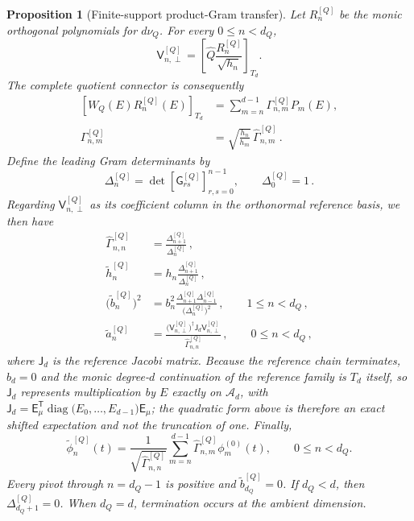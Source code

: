 \documentclass[a4paper,11pt]{article}
\def\dd{d}%
\newtheorem{proposition}{Proposition}[section]
\theoremstyle{definition}
\theoremstyle{remark}
\newcommand{\dd}{\mathrm d}
\newcommand{\cA}{\mathcal A}
\newcommand{\diag}{\operatorname{diag}}
\newcommand{\tphi}{\widetilde\phi}
\newcommand{\thh}{\widetilde h}
\newcommand{\Qhat}{\widehat Q}
\begin{document}
\begin{proposition}[Finite-support product-Gram transfer]
\label{prop:finite-product-Gram}
Let $R_n^{[Q]}$ be the monic orthogonal polynomials for $\dd\nu_Q$.
For every $0\le n<d_Q$,
\begin{equation}
   \mathsf V_{n,\perp}^{[Q]}
   =\left[
      \Qhat\frac{R_n^{[Q]}}{\sqrt{h_n}}
   \right]_{T_d}.
   \label{eq:finite-product-residual-polynomial-app}
\end{equation}
The complete quotient connector is consequently
\begin{equation}
\begin{aligned}
   \left[
      W_Q(E)R_n^{[Q]}(E)
   \right]_{T_d}
   &=\sum_{m=n}^{d-1}
   \Gamma_{n,m}^{[Q]}P_m(E),\\
   \Gamma_{n,m}^{[Q]}
   &=\sqrt{\frac{h_n}{h_m}}\,
   \widehat\Gamma_{n,m}^{[Q]}\,.
\end{aligned}
   \label{eq:finite-product-connector-app}
\end{equation}
Define the leading Gram determinants by
\begin{equation}
   \Delta_n^{[Q]}
   =\det\!\left[
      \mathsf G_{rs}^{[Q]}
   \right]_{r,s=0}^{n-1},
   \qquad \Delta_0^{[Q]}=1\,.
\end{equation}
Regarding $\mathsf V_{n,\perp}^{[Q]}$ as its coefficient column in the
orthonormal reference basis, we then have
\begin{equation}
\begin{aligned}
   \widehat\Gamma_{n,n}^{[Q]}
   &=\frac{\Delta_{n+1}^{[Q]}}{\Delta_n^{[Q]}}\,,\\
   \thh_n^{[Q]}
   &=h_n\frac{\Delta_{n+1}^{[Q]}}{\Delta_n^{[Q]}}\,,\\
   \bigl(\widetilde b_n^{[Q]}\bigr)^2
   &=b_n^2
   \frac{\Delta_{n+1}^{[Q]}\Delta_{n-1}^{[Q]}}
        {\bigl(\Delta_n^{[Q]}\bigr)^2}\,,
   \qquad 1\le n<d_Q\,,\\
   \widetilde a_n^{[Q]}
   &=\frac{
      \bigl(\mathsf V_{n,\perp}^{[Q]}\bigr)^\dagger
      \mathsf J_d\mathsf V_{n,\perp}^{[Q]}}
      {\widehat\Gamma_{n,n}^{[Q]}}\,,
   \qquad 0\le n<d_Q\,,
\end{aligned}
   \label{eq:finite-product-determinants-app}
\end{equation}
where $\mathsf J_d$ is the reference Jacobi matrix. Because the reference chain terminates, $b_d=0$ and the monic degree-$d$ continuation of the reference family is $T_d$ itself, so $\mathsf J_d$ represents multiplication by $E$ exactly on $\cA_d$, with $\mathsf J_d=\mathsf E_\mu^{\mathsf T}\diag\!\bigl(E_0,\ldots,E_{d-1}\bigr)\mathsf E_\mu$; the quadratic form above is therefore an exact shifted expectation and not the truncation of one.  Finally,
\begin{equation}
   \tphi_n^{[Q]}(t)
   =\frac{1}{\sqrt{\widehat\Gamma_{n,n}^{[Q]}}}
   \sum_{m=n}^{d-1}
   \widehat\Gamma_{n,m}^{[Q]}\phi_m^{(0)}(t),
   \qquad 0\le n<d_Q.
   \label{eq:finite-product-amplitude-app}
\end{equation}
Every pivot through $n=d_Q-1$ is positive and
$\widetilde b_{d_Q}^{[Q]}=0$.  If $d_Q<d$, then
$\Delta_{d_Q+1}^{[Q]}=0$. When $d_Q=d$, termination occurs at the
ambient dimension.
\end{proposition}
\end{document}
